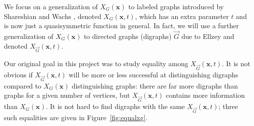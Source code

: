 \documentclass[ALCO,Unicode,published]{cedram}
\newcommand{\diG}{\overrightarrow{G}}
\newcommand{\x}{\mathbf{x}}
\begin{document}
We focus on a generalization of $X_G(\x)$ to labeled graphs introduced by Shareshian and Wachs \cite{ShWa16}, denoted $X_G(\x, t)$, which has an extra parameter $t$ and is now just a quasisymmetric function in general.  In fact, we will use a further generalization of $X_G(\x)$ to directed graphs (digraphs) $\diG$ due to Ellzey \cite{Ell17,Ell17+,EllThesis} and denoted $X_{\diG}(\x,t)$. 

Our original goal in this project was to study equality among $X_{\diG}(\x, t)$.  It is not obvious if $X_{\diG}(\x, t)$ will be more or less successful at distinguishing digraphs compared to $X_G(\x)$ distinguishing graphs: there are far more digraphs than graphs for a given number of vertices, but $X_{\diG}(\x, t)$ contains more information than $X_G(\x)$.  It is not hard to find digraphs with the same $X_{\diG}(\x, t)$; three such equalities are given in Figure~\ref{fig:equalxg}.  

  
\end{document}
